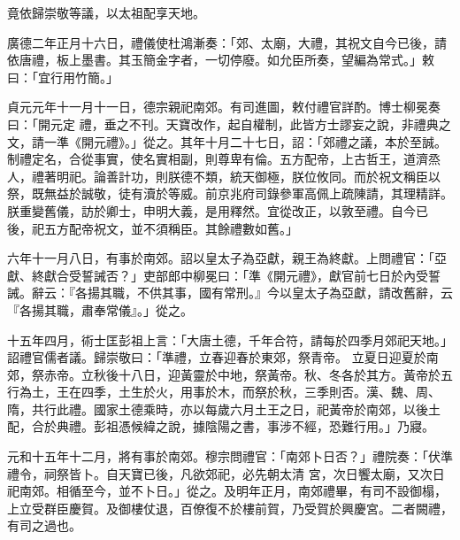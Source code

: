 \begin{pinyinscope}
 竟依歸崇敬等議，以太祖配享天地。



 廣德二年正月十六日，禮儀使杜鴻漸奏：「郊、太廟，大禮，其祝文自今已後，請依唐禮，板上墨書。其玉簡金字者，一切停廢。如允臣所奏，望編為常式。」敕曰：「宜行用竹簡。」



 貞元元年十一月十一日，德宗親祀南郊。有司進圖，敕付禮官詳酌。博士柳冕奏曰：「開元定
 禮，垂之不刊。天寶改作，起自權制，此皆方士謬妄之說，非禮典之文，請一準《開元禮》。」從之。其年十月二十七日，詔：「郊禮之議，本於至誠。制禮定名，合從事實，使名實相副，則尊卑有倫。五方配帝，上古哲王，道濟烝人，禮著明祀。論善計功，則朕德不類，統天御極，朕位攸同。而於祝文稱臣以祭，既無益於誠敬，徒有瀆於等威。前京兆府司錄參軍高佩上疏陳請，其理精詳。朕重變舊儀，訪於卿士，申明大義，是用釋然。宜從改正，以敦至禮。自今已
 後，祀五方配帝祝文，並不須稱臣。其餘禮數如舊。」



 六年十一月八日，有事於南郊。詔以皇太子為亞獻，親王為終獻。上問禮官：「亞獻、終獻合受誓誡否？」吏部郎中柳冕曰：「準《開元禮》，獻官前七日於內受誓誡。辭云：『各揚其職，不供其事，國有常刑。』今以皇太子為亞獻，請改舊辭，云『各揚其職，肅奉常儀』。」從之。



 十五年四月，術士匡彭祖上言：「大唐土德，千年合符，請每於四季月郊祀天地。」詔禮官儒者議。歸崇敬曰：「準禮，立春迎春於東郊，祭青帝。
 立夏日迎夏於南郊，祭赤帝。立秋後十八日，迎黃靈於中地，祭黃帝。秋、冬各於其方。黃帝於五行為土，王在四季，土生於火，用事於木，而祭於秋，三季則否。漢、魏、周、隋，共行此禮。國家土德乘時，亦以每歲六月土王之日，祀黃帝於南郊，以後土配，合於典禮。彭祖憑候緯之說，據陰陽之書，事涉不經，恐難行用。」乃寢。



 元和十五年十二月，將有事於南郊。穆宗問禮官：「南郊卜日否？」禮院奏：「伏準禮令，祠祭皆卜。自天寶已後，凡欲郊祀，必先朝太清
 宮，次日饗太廟，又次日祀南郊。相循至今，並不卜日。」從之。及明年正月，南郊禮畢，有司不設御榻，上立受群臣慶賀。及御樓仗退，百僚復不於樓前賀，乃受賀於興慶宮。二者闕禮，有司之過也。



\end{pinyinscope}